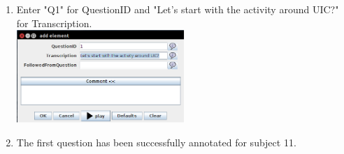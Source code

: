 \documentclass[]{article}
\begin{document}
\begin{enumerate}
\item Enter "Q1" for QuestionID and "Let's start with the activity around UIC?" for Transcription. \\
\includegraphics[width=0.5\textwidth]{add_transcription_element.png}
\\
\item The first question has been successfully annotated for subject 11.
\end{enumerate}
\end{document}
